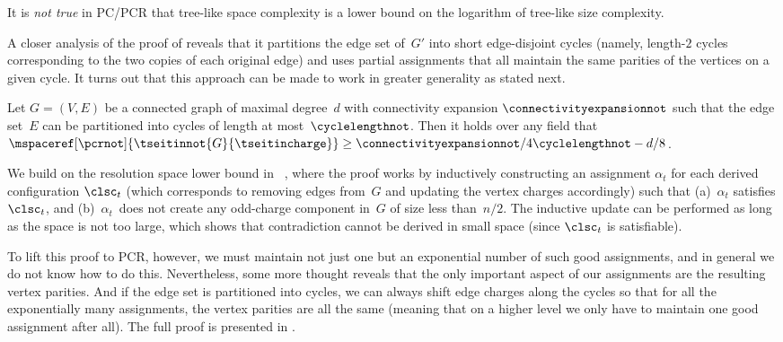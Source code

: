 \begin{corollary}
  \label{cor:no-space-leq-log-length-bounf}
  It is \emph{not true} in PC/PCR
  that tree-like space complexity is %
  a lower bound on 
  the logarithm of tree-like size complexity.
\end{corollary}

\label{sec:tseitin-overview}

A closer analysis of the proof of
reveals that it partitions the edge set of~$G'$
into %
short  %
edge-disjoint cycles (namely, \mbox{length-$2$} cycles 
corresponding to the two copies of each original
edge) and uses partial assignments
%
that all maintain the same parities of the vertices on a given
cycle. It turns out that this approach can be made to work in
greater generality as stated next.

\begin{theorem}
  \label{th:tseitin-small-cycles-space-lower-bound}
  Let $G = (V,E)$ be a
  connected
  graph of %
  maximal degree~$d$  %
  with connectivity expansion $\connectivityexpansionnot$ such that 
  the edge set~$E$ can be partitioned into
  cycles of length at most~$\cyclelengthnot$.
  Then it holds over any field that
  $
  \mspaceref[\pcrnot]{\tseitinnot{G}{\tseitincharge}}\geq
  \connectivityexpansionnot/4\cyclelengthnot -d/8 
  $.
\end{theorem}

\begin{ourproof}[sketch]
%
%
  We build on the
  resolution space lower bound in~%
  \mbox{\cite{ABRW02SpaceComplexity,ET01SpaceBounds},}
  where the proof works by inductively constructing an assignment
  $\alpha_t$ for
  each derived configuration $\clsc_t$
  (which corresponds to removing edges 
  from~$G$
%
  and updating the vertex
  charges accordingly) such that
  (a)~$\alpha_t$ satisfies $\clsc_t$, and  
  (b)~$\alpha_t$~does not create any odd-charge component in~$G$ of 
  size less than~$n/2$.
  The inductive update 
  can be performed 
%
  as long as the space is not too large,
  which shows that contradiction cannot be derived in small space
  (since $\clsc_t$ is satisfiable).

  To lift this proof to PCR, however, 
%
  we must maintain not just one but an exponential number of such good
  assignments, and in general we do not know how to do this.
  Nevertheless, some more thought reveals that the only important
  aspect of our assignments are the resulting vertex parities.
  And if the edge set is partitioned into cycles, we can always shift
  edge charges along the cycles so that for all the exponentially many
  assignments,  
  the vertex parities
  are all the same (meaning 
  that on a higher level
  we only have to maintain one good assignment after  all). 
%
  The full proof is presented in .
\end{ourproof}

